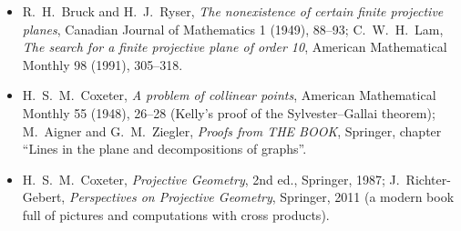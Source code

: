 \begin{itemize}
\item R.~H.~Bruck and H.~J.~Ryser, \emph{The nonexistence of certain finite projective planes}, Canadian Journal of Mathematics 1 (1949), 88--93;
C.~W.~H.~Lam, \emph{The search for a finite projective plane of order 10}, American Mathematical Monthly 98 (1991), 305--318.
\item H.~S.~M.~Coxeter, \emph{A problem of collinear points}, American Mathematical Monthly 55 (1948), 26--28 (Kelly's proof of the
Sylvester--Gallai theorem); M.~Aigner and G.~M.~Ziegler, \emph{Proofs from THE BOOK}, Springer, chapter ``Lines in the plane and decompositions of
graphs''.
\item H.~S.~M.~Coxeter, \emph{Projective Geometry}, 2nd ed., Springer, 1987; J.~Richter-Gebert, \emph{Perspectives on Projective Geometry}, Springer,
2011 (a modern book full of pictures and computations with cross products).
\end{itemize}
